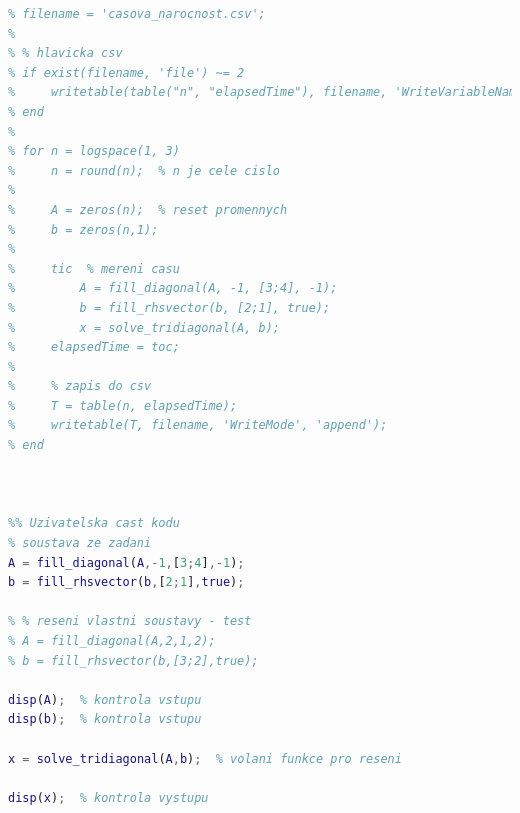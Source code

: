 \documentclass[12pt]{CLASS/protokol}
\begin{document}
\begin{lstlisting}[language=MATLAB,label=ls:uf]
% %% Vyhodnoceni casove narocnosti
% filename = 'casova_narocnost.csv';
%
% % hlavicka csv
% if exist(filename, 'file') ~= 2
%     writetable(table("n", "elapsedTime"), filename, 'WriteVariableNames', false);
% end
%
% for n = logspace(1, 3)
%     n = round(n);  % n je cele cislo
%
%     A = zeros(n);  % reset promennych
%     b = zeros(n,1);
%
%     tic  % mereni casu
%         A = fill_diagonal(A, -1, [3;4], -1);
%         b = fill_rhsvector(b, [2;1], true);
%         x = solve_tridiagonal(A, b);
%     elapsedTime = toc;
%
%     % zapis do csv
%     T = table(n, elapsedTime);
%     writetable(T, filename, 'WriteMode', 'append');
% end



%% Uzivatelska cast kodu
% soustava ze zadani
A = fill_diagonal(A,-1,[3;4],-1);
b = fill_rhsvector(b,[2;1],true);

% % reseni vlastni soustavy - test
% A = fill_diagonal(A,2,1,2);
% b = fill_rhsvector(b,[3;2],true);

disp(A);  % kontrola vstupu
disp(b);  % kontrola vstupu

x = solve_tridiagonal(A,b);  % volani funkce pro reseni

disp(x);  % kontrola vystupu
\end{lstlisting}
\end{document}

